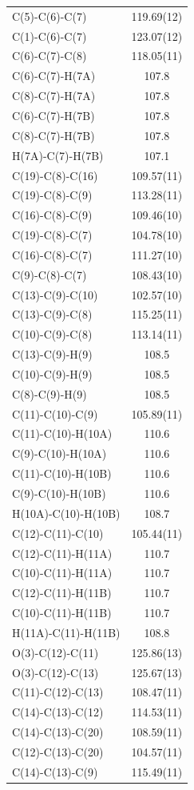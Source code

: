 \begin{center}
{\begin{supertabular}{p{1.5in}c}
C(5)-C(6)-C(7)&119.69(12)\\
C(1)-C(6)-C(7)&123.07(12)\\
C(6)-C(7)-C(8)&118.05(11)\\
C(6)-C(7)-H(7A)&107.8\\
C(8)-C(7)-H(7A)&107.8\\
C(6)-C(7)-H(7B)&107.8\\
C(8)-C(7)-H(7B)&107.8\\
H(7A)-C(7)-H(7B)&107.1\\
C(19)-C(8)-C(16)&109.57(11)\\
C(19)-C(8)-C(9)&113.28(11)\\
C(16)-C(8)-C(9)&109.46(10)\\
C(19)-C(8)-C(7)&104.78(10)\\
C(16)-C(8)-C(7)&111.27(10)\\
C(9)-C(8)-C(7)&108.43(10)\\
C(13)-C(9)-C(10)&102.57(10)\\
C(13)-C(9)-C(8)&115.25(11)\\
C(10)-C(9)-C(8)&113.14(11)\\
C(13)-C(9)-H(9)&108.5\\
C(10)-C(9)-H(9)&108.5\\
C(8)-C(9)-H(9)&108.5\\
C(11)-C(10)-C(9)&105.89(11)\\
C(11)-C(10)-H(10A)&110.6\\
C(9)-C(10)-H(10A)&110.6\\
C(11)-C(10)-H(10B)&110.6\\
C(9)-C(10)-H(10B)&110.6\\
H(10A)-C(10)-H(10B)&108.7\\
C(12)-C(11)-C(10)&105.44(11)\\
C(12)-C(11)-H(11A)&110.7\\
C(10)-C(11)-H(11A)&110.7\\
C(12)-C(11)-H(11B)&110.7\\
C(10)-C(11)-H(11B)&110.7\\
H(11A)-C(11)-H(11B)&108.8\\
O(3)-C(12)-C(11)&125.86(13)\\
O(3)-C(12)-C(13)&125.67(13)\\
C(11)-C(12)-C(13)&108.47(11)\\
C(14)-C(13)-C(12)&114.53(11)\\
C(14)-C(13)-C(20)&108.59(11)\\
C(12)-C(13)-C(20)&104.57(11)\\
C(14)-C(13)-C(9)&115.49(11)\\

\end{supertabular}}
\end{center}
